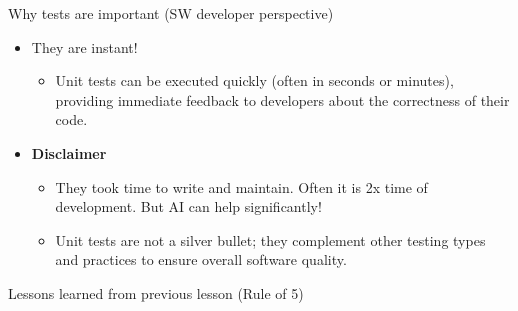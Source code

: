 \begin{frame}{Why tests are important (SW developer perspective)}
\protect{}\label{why-tests-are-important-sw-developer-perspective-1}
\begin{itemize}
\tightlist
\item
  They are instant!

  \begin{itemize}
  \tightlist
  \item
    Unit tests can be executed quickly (often in seconds or minutes),
    providing immediate feedback to developers about the correctness of
    their code.
  \end{itemize}
\item
  \textbf{Disclaimer}

  \begin{itemize}
  \tightlist
  \item
    They took time to write and maintain. Often it is 2x time of
    development. But AI can help significantly!
  \item
    Unit tests are not a silver bullet; they complement other testing
    types and practices to ensure overall software quality.
  \end{itemize}
\end{itemize}
\end{frame}

\begin{frame}{Lessons learned from previous lesson (Rule of 5)}
\protect{}\label{lessons-learned-from-previous-lesson-rule-of-5}
\end{frame}

